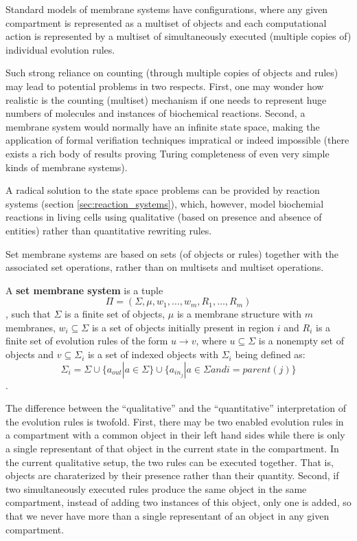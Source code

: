 Standard models of membrane systems have configurations, where any given compartment is represented as a multiset of objects and each computational action is represented by a multiset of simultaneously executed (multiple copies of) individual evolution rules.

Such strong reliance on counting (through multiple copies of objects and rules) may lead to potential problems in two respects. First, one may wonder how realistic is the counting (multiset) mechanism if one needs to represent huge numbers of molecules and instances of biochemical reactions. Second, a membrane system would normally have an infinite state space, making the application
of formal verifiation techniques impratical or indeed impossible (there exists a rich body of results proving Turing completeness of even very simple kinds of membrane systems).

A radical solution to the state space problems can be provided by reaction systems (section \ref{sec:reaction_systems}), which, however, model biochemial reactions in living cells using qualitative (based on presence and absence of entities) rather than quantitative rewriting rules.

Set membrane systems \cite{Kleijn11SetMembrane} are based on sets (of objects or rules) together with the associated set operations, rather than on multisets and multiset operations.

\begin{definition}
  A {\bf set membrane system} is a tuple $$\Pi = (\Sigma, \mu, w_1, \ldots, w_m, R_1, \ldots, R_m)$$, such that $\Sigma$ is a finite set of objects, $\mu$ is a membrane structure with $m$ membranes, $w_i\subseteq\Sigma$ is a set of objects initially present in region $i$ and $R_i$ is a finite set of evolution rules of the form $u\rightarrow v$, where $u\subseteq\Sigma$ is a nonempty set of objects and $v\subseteq\Sigma_i$ is a set of indexed objects with $\Sigma_i$ being defined as: $$\Sigma_i = \Sigma\cup\{a_{out}|a\in \Sigma\}\cup\{a_{in_j}|a\in\Sigma\mathrel{and}i=parent(j)\}$$.
\end{definition}

The difference between the ``qualitative'' and the ``quantitative'' interpretation of the evolution rules is twofold. First, there may be two enabled evolution rules in a compartment with a common object in their left hand sides while there is only a single representant of that object in the current state in the compartment. In the current qualitative setup, the two rules can be executed together. That is, objects are charaterized by their presence rather than their quantity. Second, if two simultaneously executed rules produce the same object in the same compartment, instead of adding two instances of this object, only one is added, so that we never have more than a single representant of an object in any given compartment.

